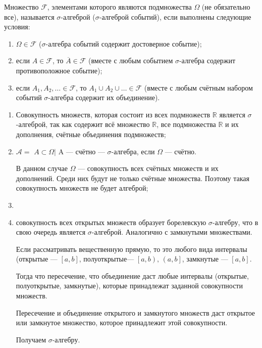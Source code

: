 Множество $ \mathcal{F} $,
элементами которого являются подмножества $ \Omega $ (не обязательно все),
называется $ \sigma $-алгеброй ($ \sigma $-алгеброй событий), если выполнены следующие условия:
\begin{enumerate}
\item $ \Omega \in \mathcal{F} $ ($ \sigma $-алгебра событий содержит достоверное событие);
\item если $A \in \mathcal{F} $,
то $ \overline{A} \in \mathcal{F} $ (вместе с любым событием $ \sigma $-алгебра содержит противоположное событие);
\item если $A_1, A_2, \dotsc \in \mathcal{F} $, то $A_1 \cup A_2 \cup \dotsc \in \mathcal{F} $
(вместе с любым счётным набором событий $ \sigma $-алгебра содержит их объединение).
\end{enumerate}

\begin{enumerate}[label=\alph*)]
\item Совокупность множеств, которая состоит из всех подмножеств $ \mathbb{R} $ является $ \sigma $-алгеброй, так как содержит всё множество $ \mathbb{R} $, все подмножества $ \mathbb{R} $ и их дополнения, счётные объединения подмножеств;
\item $ \mathcal{A} =$ {$ \left. A \subset \Omega \right| $ A --- счётно} --- $ \sigma $-алгебра, если $ \Omega $ --- счётно.

В данном случае $ \Omega $ --- совокупность всех счётных множеств и их дополнений.
Среди них будут не только счётные множества.
Поэтому такая совокупность множеств не будет алгеброй;
\item \item совокупность всех открытых множеств образует борелевскую $ \sigma $-алгебру, что в свою очередь является $ \sigma $-алгеброй.
Аналогично с замкнутыми множествами.

Если рассматривать вещественную прямую,
то это любого вида интервалы (открытые ---
$ \left[ a, b \right] $, полуоткрытые--- $\left[ a, b \right), \, \left( a, b \right] $, замкнутые --- $ \left[ a, b \right] $.

Тогда что пересечение, что объединение даст любые интервалы (открытые, полуоткрытые, замкнутые),
которые принадлежат заданной совокупности множеств.

Пересечение и объединение открытого и замкнутого множеств даст открытое или замкнутое множество, которое принадлежит этой совокупности.

Получаем $ \sigma $-алгебру.
\end{enumerate}

